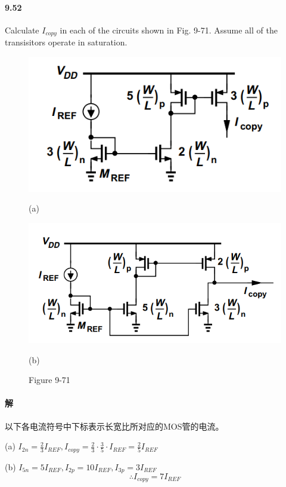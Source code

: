 \documentclass[hyperref, UTF8]{ctexart}
\begin{document}
\paragraph{9.52} \label{9.52}
    Calculate $I_{copy}$ in each of the circuits shown in Fig. 9-71. Assume all of the transisitors operate in saturation.

    \begin{figure}[!htb]
        \centering
        \begin{minipage}[t]{0.323\textwidth}
        \centering
        \includegraphics[width=1\textwidth]{p9-71-a.png}
        \caption*{(a)}
        \end{minipage}
        \begin{minipage}[t]{0.394\textwidth}
        \centering
        \includegraphics[width=1\textwidth]{p9-71-b.png}
        \caption*{(b)}
        \end{minipage}
        \caption*{Figure 9-71}
    \end{figure}

\paragraph{解} 以下各电流符号中下标表示长宽比所对应的MOS管的电流。

    (a) $I_{2n} = \frac{2}{3}I_{REF}, I_{copy} = \frac{2}{3} \cdot \frac{3}{5} \cdot I_{REF} = \frac{2}{5} I_{REF}$ 

    (b) $I_{5n} = 5I_{REF}, I_{2p} = 10I_{REF}, I_{3p} = 3I_{REF}$
    $$\therefore I_{copy} = 7I_{REF}$$
\end{document}

